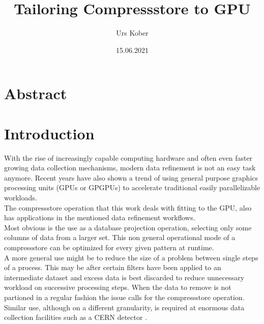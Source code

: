 \documentclass{tudscrreprt}
\begin{document}
	
	\date{15.06.2021}
	\title{Tailoring Compressstore to GPU}
	 
	\author{ Urs Kober
		\matriculationnumber{---}
		\placeofbirth{---}
	}
	\maketitle
	
	\chapter*{Abstract}
	
	\tableofcontents
	
	\chapter{Introduction}
		With the rise of increasingly capable computing hardware and often even faster growing data collection mechanisms, modern data refinement is not an easy task anymore. Recent years have also shown a trend of using general purpose graphics processing units (GPUs or GPGPUs) to accelerate traditional easily parallelizable workloads. \\
		
		The compressstore operation that this work deals with fitting to the GPU, also has applications in the mentioned data refinement workflows. \\
		Most obvious is the use as a database projection operation, selecting only some columns of data from a larger set. This non general operational mode of a compressstore can be optimized for every given pattern at runtime. \\
		A more general use might be to reduce the size of a problem between single steps of a process. This may be after certain filters have been applied to an intermediate dataset and excess data is best discarded to reduce unnecessary workload on successive processing steps. When the data to remove is not partioned in a regular fashion the issue calls for the compressstore operation. \\
		Similar use, although on a different granularity, is required at enormous data collection facilities such as a CERN detector \cite{cern_datastreaming}. \\
		
\end{document}

